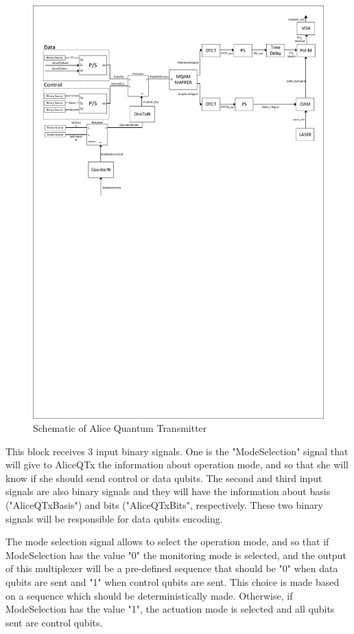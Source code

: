 \begin{figure}[h]
	\centering
	\includegraphics[clip, trim=0.5cm 15.0cm 0.5cm 0.1cm, width=1.0\textwidth]{./lib/AliceQuantumTx/figures/AliceQTx_diagram.pdf}
	\caption{Schematic of Alice Quantum Transmitter}\label{aliceQuantumTxDiagram}
\end{figure}

This block receives 3 input binary signals. One is the "ModeSelection" signal that will give to AliceQTx the information about operation mode, and so that she will know if she should send control or data qubits. The second and third input signals are also binary signals and they will have the information about basis ("AliceQTxBasis") and bits ("AliceQTxBits", respectively. These two binary signals will be responsible for data qubits encoding.

The mode selection signal allows to select the operation mode, and so that if ModeSelection has the value "0" the monitoring mode is selected, and the output of this multiplexer will be a pre-defined sequence that should be "0" when data qubits are sent and "1" when control qubits are sent. This choice is made based on a sequence which should be deterministically made. Otherwise, if ModeSelection has the value "1", the actuation mode is selected and all qubits sent are control qubits.

